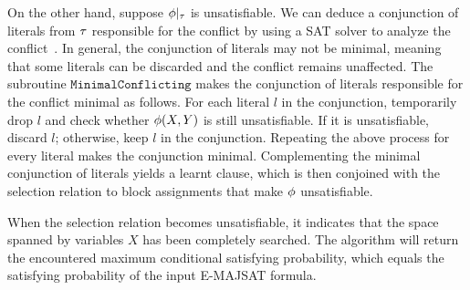 On the other hand, suppose $\phi|_{\tau}$ is unsatisfiable.
We can deduce a conjunction of literals from $\tau$ responsible for the conflict by using a SAT solver to analyze the conflict~\cite{Een2003Solver,Een2003Incremental}.
In general, the conjunction of literals may not be minimal,
meaning that some literals can be discarded and the conflict remains unaffected.
The subroutine $\texttt{MinimalConflicting}$ makes the conjunction of literals responsible for the conflict minimal as follows.
For each literal $l$ in the conjunction,
temporarily drop $l$ and check whether $\phi(X,Y)$ is still unsatisfiable.
If it is unsatisfiable, discard $l$; otherwise, keep $l$ in the conjunction.
Repeating the above process for every literal makes the conjunction minimal.
Complementing the minimal conjunction of literals yields a learnt clause,
which is then conjoined with the selection relation to block assignments that make $\phi$ unsatisfiable.

When the selection relation becomes unsatisfiable,
it indicates that the space spanned by variables $X$ has been completely searched.
The algorithm will return the encountered maximum conditional satisfying probability,
which equals the satisfying probability of the input E-MAJSAT formula.

